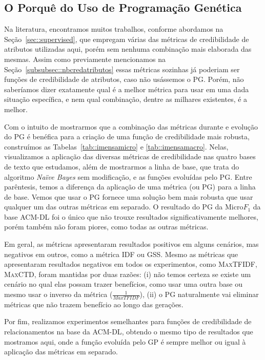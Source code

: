 \subsection{O Porquê do Uso de Programação Genética}
\label{subsec::ganhosgp}

Na literatura, encontramos muitos trabalhos, conforme abordamos na Seção~\ref{sec::supervised}, que empregam várias das métricas de credibilidade de atributos utilizadas aqui, porém sem nenhuma combinação mais elaborada das mesmas. 
Assim como previamente mencionamos na Seção~\ref{subsubsec::nbcredatributos} essas métricas sozinhas já poderiam ser funções de credibilidade de atributos, caso não usássemos o \textsc{PG}. Porém, não saberíamos dizer exatamente qual é a melhor métrica para usar em uma dada situação específica, e nem qual combinação, dentre as milhares existentes, é a melhor. 

Com o intuito de mostrarmos que a combinação das métricas durante e evolução do \textsc{PG} é benéfica para a criação de uma função de credibilidade mais robusta, construímos as Tabelas~\ref{tab::imensamicro} e \ref{tab::imensamacro}. 
Nelas, visualizamos a aplicação das diversas métricas de credibilidade nas quatro bases de texto que estudamos, além de mostrarmos a linha de base, que trata do algoritmo \textit{Naïve Bayes} sem modificação, e as funções evoluídas pelo \textsc{PG}. Entre parêntesis, temos a diferença da aplicação de uma métrica (ou \textsc{PG}) para a linha de base.
Vemos que usar o \textsc{PG} fornece uma solução bem mais robusta que usar qualquer um das outras métricas em separado. O resultado do \textsc{PG} da Micro$F_1$ da base \textsc{ACM-DL} foi o único que não trouxe resultados significativamente melhores, porém também não foram piores, como todas as outras métricas.

Em geral, as métricas apresentaram resultados positivos em alguns cenários, mas negativos em outros, como a métrica \textsc{IDF} ou \textsc{GSS}. Mesmo as métricas que apresentaram resultados negativos em todos os experimentos, como \textsc{MaxTFIDF}, \textsc{MaxCTD}, foram mantidas por duas razões: (i) não temos certeza se existe um cenário no qual elas possam trazer benefícios, como usar uma outra base ou mesmo usar o inverso da métrica ($\frac{1}{MaxTFIDF}$), (ii) o \textsc{PG} naturalmente vai eliminar métricas que não trazem benefício ao longo das gerações. 

Por fim, realizamos experimentos semelhantes para funções de credibilidade de relacionamentos na base da \textsc{ACM-DL}, obtendo o mesmo tipo de resultados que mostramos aqui, onde a função evoluída pelo \textsc{GP} é sempre melhor ou igual à aplicação das métricas em separado.


